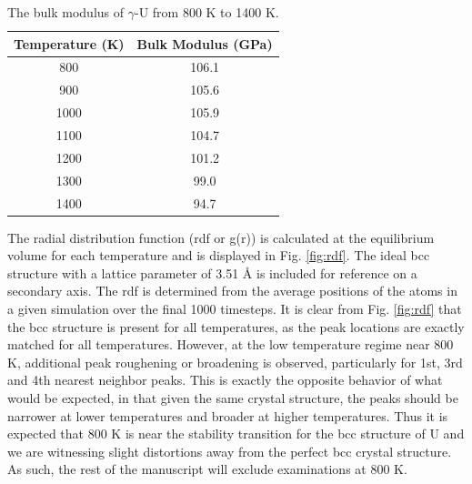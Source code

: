 \documentclass[review]{elsarticle}
\begin{document}
\begin{table}[h]
\caption{The bulk modulus of $\gamma$-U from 800 K to 1400 K.} \label{tab:bulk}
\begin{center}
\begin{tabular}{|c|c|}
	\hline
	Temperature (K) & Bulk Modulus (GPa) \\
	 \hline
	 800 & 106.1 \\
	 900 & 105.6 \\
	 1000 & 105.9 \\
	 1100 & 104.7 \\
	 1200 & 101.2 \\	 
	 1300 & 99.0 \\
	 1400 & 94.7 \\
	 \hline
\end{tabular}
\end{center}
\label{default}
\end{table}

\FloatBarrier

The radial distribution function (rdf or g(r)) is calculated at the equilibrium volume for each temperature and is displayed in Fig. \ref{fig:rdf}. The ideal bcc structure with a lattice parameter of 3.51 {\AA} is included for reference on a secondary axis. The rdf is determined from the average positions of the atoms in a given simulation over the final 1000 timesteps. It is clear from Fig. \ref{fig:rdf} that the bcc structure is present for all temperatures, as the peak locations are exactly matched for all temperatures. However, at the low temperature regime near 800 K, additional peak roughening or broadening is observed, particularly for 1st, 3rd and 4th nearest neighbor peaks. This is exactly the opposite behavior of what would be expected, in that given the same crystal structure, the peaks should be narrower at lower temperatures and broader at higher temperatures. Thus it is expected that 800 K is near the stability transition for the bcc structure of U and we are witnessing slight distortions away from the perfect bcc crystal structure. As such, the rest of the manuscript will exclude examinations at 800 K.
\end{document}
